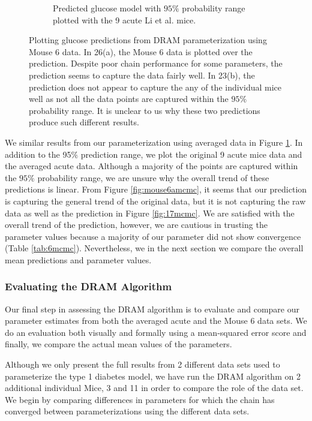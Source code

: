 \begin{figure}[H]
\begin{subfigure}{.7\textwidth}
    \caption{Predicted glucose model with $95\%$ probability range plotted with the 9 acute Li et al. mice.}
    \label{fig:mouse6bmcmc}
\end{subfigure}
\caption{Plotting glucose predictions from DRAM parameterization using Mouse 6 data. In 26(a), the Mouse 6 data is plotted over the prediction. Despite poor chain performance for some parameters, the prediction seems to capture the data fairly well. In 23(b), the prediction does not appear to capture the any of the individual mice well as not all the data points are captured within the $95\%$ probability range. It is unclear to us why these two predictions produce such different results.}
\label{fig:mouse6mcmc}
\end{figure}
We similar results from our parameterization using averaged data in Figure \ref{fig:mouse6bmcmc}. In addition to the 95$\%$ prediction range, we plot the original 9 acute mice data and the averaged acute data. Although a majority of the points are captured within the $95\%$ probability range, we are unsure why the overall trend of these predictions is linear. From Figure \ref{fig:mouse6amcmc}, it seems that our prediction is capturing the general trend of the original data, but it is not capturing the raw data as well as the prediction in Figure \ref{fig:17mcmc}. We are satisfied with the overall trend of the prediction, however, we are cautious in trusting the parameter values because a majority of our parameter did not show convergence (Table \ref{tab:6mcmc}). Nevertheless, we in the next section we compare the overall mean predictions and parameter values.
\subsubsection{Evaluating the DRAM Algorithm}
Our final step in assessing the DRAM algorithm is to evaluate and compare our parameter estimates from both the averaged acute and the Mouse 6 data sets. We do an evaluation both visually and formally using a mean-squared error score and finally, we compare the actual mean values of the parameters. 
\par Although we only present the full results from 2 different data sets used to parameterize the type 1 diabetes model, we have run the DRAM algorithm on 2 additional individual Mice, 3 and 11 in order to compare the role of the data set. We begin by comparing differences in parameters for which the chain has converged between parameterizations using the different data sets.

